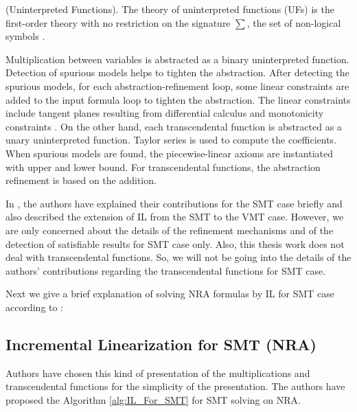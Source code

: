 \begin{definition}
    (Uninterpreted Functions).
    The theory of uninterpreted functions (UFs) is the first-order theory with no restriction on the signature $\sum$, the set of non-logical symbols \cite{Cimatti:2018:ILS:3274693.3230639}.
 \end{definition}
 
\noindent Multiplication between variables is abstracted as a binary uninterpreted function.
Detection of spurious models helps to tighten the abstraction.
After detecting the spurious models, for each abstraction-refinement loop, some linear constraints are added to the input formula loop to tighten the abstraction.
The linear constraints include tangent planes resulting from differential calculus and monotonicity constraints \cite{Cimatti:2018:ILS:3274693.3230639}.
On the other hand, each transcendental function is abstracted as a unary uninterpreted function.
Taylor series is used to compute the coefficients.
When spurious models are found, the piecewise-linear axioms are instantiated with upper and lower bound.
For transcendental functions, the abstraction refinement is based on the addition.\newline

\noindent In \cite{Cimatti:2018:ILS:3274693.3230639}, the authors have explained their contributions for the SMT case briefly and also described the extension of IL from the SMT to the VMT case. 
However, we are only concerned about the details of the refinement mechanisms and of the detection of satisfiable results for SMT case only.
Also, this thesis work does not deal with transcendental functions.
So, we will not be going into the details of the authors' contributions regarding the transcendental functions for SMT case.

\noindent Next we give a brief explanation of solving NRA formulas by IL for SMT case according to \cite{Cimatti:2018:ILS:3274693.3230639}:
\subsection{Incremental Linearization for SMT (NRA)}
\label{subsec:IL_For_SMT}
Authors have chosen this kind of presentation of the multiplications and transcendental functions for the simplicity of the presentation.
The authors have proposed the Algorithm \ref{alg:IL_For_SMT} for SMT solving on NRA.\newline

